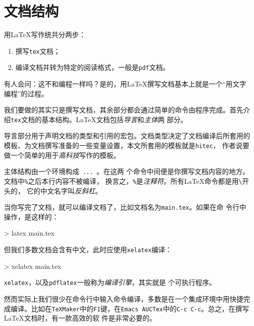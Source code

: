 \section{文档结构}

用\LaTeX{}写作统共分两步：
\begin{enumerate}
\item 撰写\texttt{tex}文档；
\item 编译文档并转为特定的阅读格式，一般是\texttt{pdf}文档。
\end{enumerate}

有人会问：这不和编程一样吗？是的，用\LaTeX{}撰写文档基本上就是一个“用文字
编程”的过程。

我们要做的其实只是撰写文档，其余部分都会通过简单的命令由程序完成。首先介
绍\texttt{tex}文档的基本结构。\LaTeX{}文档包括\emph{导言}和\emph{主体}两
部分。

导言部分用于声明文档的类型和引用的宏包。文档类型决定了文档编译后所套用的
模板、为文档撰写准备的一些变量设置，本文所套用的模板就是\texttt{hitec}，
作者说要做一个简单的用于\emph{高科技}写作的模板。

主体结构由一个环境构成\verb! ... !。在这两
个命令中间便是你撰写文档内容的地方。文档中\verb!%!之后本行内容不被编译，
换言之，\verb!%!是\emph{注释符}。所有\LaTeX{}命令都是用\verb!\!开头的，
它的中文名字叫\emph{反斜杠}。

  

当你写完了文档，就可以编译文档了，比如文档名为\texttt{main.tex}。如果在命
令行中操作，是这样的：

\begin{cmd}
  > latex main.tex
\end{cmd}

但我们多数文档会含有中文，此时应使用\texttt{xelatex}编译：

\begin{cmd}
  > xelatex main.tex
\end{cmd}

\texttt{xelatex}，以及\texttt{pdflatex}一般称为\emph{编译引擎}，其实就是
个可执行程序。

然而实际上我们很少在命令行中输入命令编译，多数是在一个集成环境中用快捷完
成编译。比如在\texttt{TeXMaker}中的\texttt{F1}键，在\texttt{Emacs
AUCTex}中的\texttt{C-c C-c}。总之，在撰写\LaTeX{}文档时，有一款高效的软
件是非常必要的。


